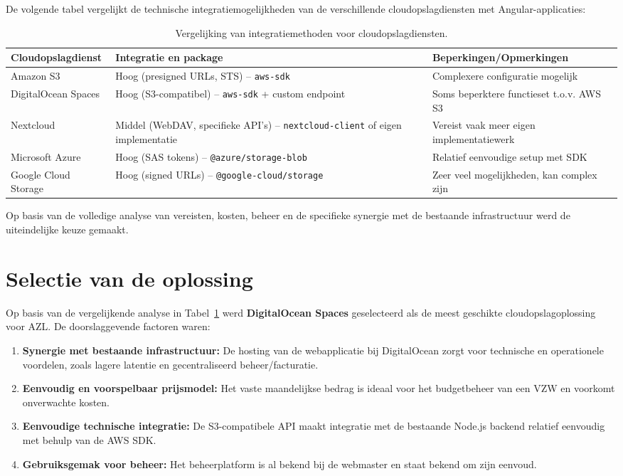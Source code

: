 De volgende tabel vergelijkt de technische integratiemogelijkheden van de verschillende cloudopslagdiensten met Angular-applicaties:

\begin{table}[H]
    \centering
    \footnotesize
    \begin{tabular}{l p{5cm} p{5cm}}
      \toprule
      \textbf{Cloudopslagdienst} & \textbf{Integratie en package} & \textbf{Beperkingen/Opmerkingen} \\
      \midrule
      Amazon S3 & Hoog (presigned URLs, STS) – \texttt{aws-sdk} & Complexere configuratie mogelijk \\
      DigitalOcean Spaces & Hoog (S3-compatibel) – \texttt{aws-sdk} + custom endpoint & Soms beperktere functieset t.o.v. AWS S3 \\
      Nextcloud & Middel (WebDAV, specifieke API's) – \texttt{nextcloud-client} of eigen implementatie & Vereist vaak meer eigen implementatiewerk \\
      Microsoft Azure & Hoog (SAS tokens) – \texttt{@azure/storage-blob} & Relatief eenvoudige setup met SDK \\
      Google Cloud Storage & Hoog (signed URLs) – \texttt{@google-cloud/storage} & Zeer veel mogelijkheden, kan complex zijn \\
      \bottomrule
    \end{tabular}
    \caption[Vergelijking cloudintegraties]{\label{tab:cloud-integratie-vergelijking}Vergelijking van integratiemethoden voor cloudopslagdiensten.}
\end{table}

Op basis van de volledige analyse van vereisten, kosten, beheer en de specifieke synergie met de bestaande infrastructuur werd de uiteindelijke keuze gemaakt.

\section{Selectie van de oplossing}
Op basis van de vergelijkende analyse in Tabel~\ref{tab:cloud-integratie-vergelijking} werd \textbf{DigitalOcean Spaces} geselecteerd als de meest geschikte cloudopslagoplossing voor AZL. De doorslaggevende factoren waren:
\begin{enumerate}
    \item \textbf{Synergie met bestaande infrastructuur:} De hosting van de webapplicatie bij DigitalOcean zorgt voor technische en operationele voordelen, zoals lagere latentie en gecentraliseerd beheer/facturatie.
    \item \textbf{Eenvoudig en voorspelbaar prijsmodel:} Het vaste maandelijkse bedrag is ideaal voor het budgetbeheer van een VZW en voorkomt onverwachte kosten.
    \item \textbf{Eenvoudige technische integratie:} De S3-compatibele API maakt integratie met de bestaande Node.js backend relatief eenvoudig met behulp van de AWS SDK.
    \item \textbf{Gebruiksgemak voor beheer:} Het beheerplatform is al bekend bij de webmaster en staat bekend om zijn eenvoud.
\end{enumerate}

